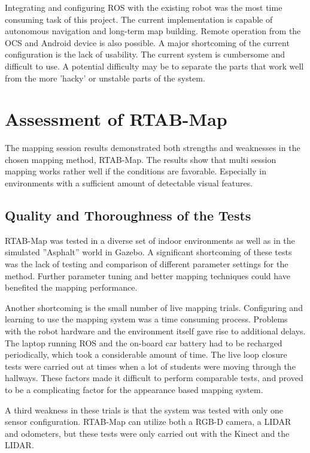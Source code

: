 Integrating and configuring \ac{ROS} with the existing robot was the most time consuming task of this project. The current implementation is capable of autonomous navigation and long-term map building. Remote operation from the \ac{OCS} and Android device is also possible. A major shortcoming of the current configuration is the lack of usability. The current system is 
cumbersome and difficult to use. A potential difficulty may be to separate the parts that work well from the more 'hacky' or unstable parts of the system. 


\section{Assessment of RTAB-Map}

The mapping session results demonstrated both strengths and weaknesses  in the chosen mapping method, \ac{RTAB-Map}. The results show that multi session mapping works rather well if the conditions are favorable. Especially in environments with a sufficient amount of detectable visual features. 

\subsection{Quality and Thoroughness of the Tests}

\ac{RTAB-Map} was tested in a diverse set of indoor environments as well as in the simulated ''Asphalt'' world in Gazebo. A significant shortcoming of these tests was the lack of testing and comparison of different parameter settings for the method. Further parameter tuning and better mapping techniques could have benefited the mapping performance.

Another shortcoming is the small number of live mapping trials. Configuring and learning to use the mapping system was a time consuming process. Problems with the robot hardware and the environment itself gave rise to additional delays. The laptop running \ac{ROS} and the on-board car battery had to be recharged periodically, which took a considerable amount of time. The live loop closure tests were carried out at times when a lot of students were moving through the hallways. These factors made it difficult to perform comparable tests, and proved to be a complicating factor for the appearance based mapping system. 

A third weakness in these trials is that the system was tested with only one sensor configuration. \ac{RTAB-Map} can utilize both a RGB-D camera, a LIDAR and odometers, but these tests were only carried out with the Kinect and the LIDAR.

